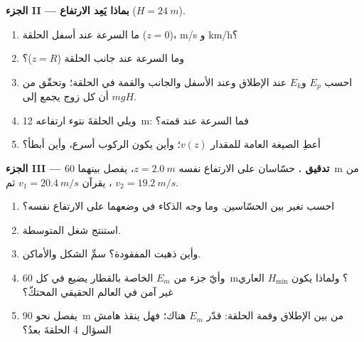 \begin{problem}
\medskip
\noindent\textbf{الجزء II --- بماذا يَعِد الارتفاع} ($H = \qty{24}{m}$).
\begin{enumerate}[resume]
  \item ما السرعة عند أسفل الحلقة ($z = 0$)،  \unit{m/s} و
         \unit{km/h}؟
  \item وما السرعة عند جانب الحلقة ($z = R$)؟
  \item احسب $E_p$ و$E_k$ عند الإطلاق وعند الأسفل والجانب والقمة
        في الحلقة؛ وتحقّق من أن كل زوج يجمع إلى $mgH$.
  \item ويلي الحلقةَ نتوء ارتفاعه \qty{12}{m}: فما السرعة عند قمته؟
  \item أعطِ الصيغة العامة للمقدار $v(z)$؛ وأين يكون الركوب
        أسرع، وأين أبطأ؟
\end{enumerate}

\medskip
\noindent\textbf{الجزء III --- تدقيق .}
حسّاسان على الارتفاع نفسه $z = \qty{2.0}{m}$، يفصل بينهما \qty{60}{m} من
، يقرآن $v_1 = \qty{20.4}{m/s}$ ثم $v_2 = \qty{19.2}{m/s}$.
\begin{enumerate}[resume]
  \item احسب تغير  بين الحسّاسين.
        وما وجه الذكاء في وضعهما على الارتفاع نفسه؟
  \item استنتج شغل    المتوسطة.
  \item وأين ذهبت  المفقودة؟ سمِّ الشكل والأماكن.
  \item وأيّ جزء من $E_m$ الخاصة بالقطار يضيع في كل \qty{60}{m}؟ ولماذا
        يكون $H_{\min}$ العاري غير آمن في العالم الحقيقي المحتكّ؟
  \item يفصل نحو \qty{90}{m} من  بين الإطلاق وقمة الحلقة: قدّر
        $E_m$ هناك؛ فهل ينقذ هامش السؤال 4 الحلقةَ بعدُ؟
\end{enumerate}


\end{problem}
